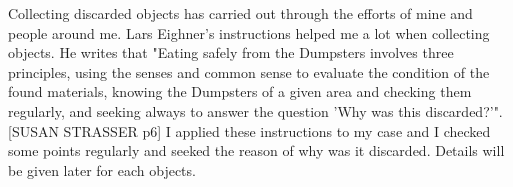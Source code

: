 








Collecting discarded objects has carried out through the efforts of mine and people around me. Lars Eighner's instructions helped me a lot when collecting objects. He writes that "Eating safely from the Dumpsters involves three principles, using the senses and common sense to evaluate the condition of the found materials, knowing the Dumpsters of a given area and checking them regularly, and seeking always to answer the question 'Why was this discarded?'". [SUSAN STRASSER p6] I applied these instructions to my case and I checked some points regularly and seeked the reason of why was it discarded. Details will be given later for each objects. 

